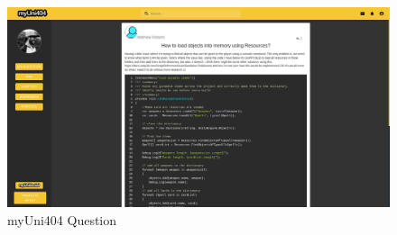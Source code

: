 \documentclass[lettersize,journal]{IEEEtran}
\begin{document}
\begin{figure}[h!]
                \includegraphics[width=0.85\paperwidth]{images/404screenshot.png}
                \caption{myUni404 Question}
                \label{figure 4}
\end{figure}

\vspace{11pt}


\vspace{11pt}


\vfill
\end{document}
